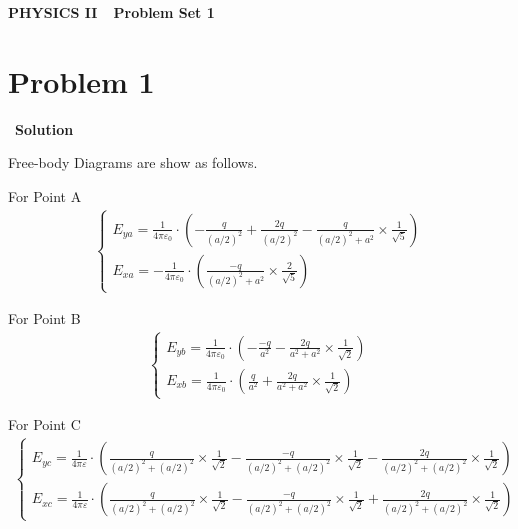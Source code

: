 \documentclass[12pt,a4paper]{article}
\begin{document}
\centerline{\Huge{{\textbf{PHYSICS II\ \ Problem Set 1}}}}
\vspace{0.5cm}
\section*{\large \textbf{Problem 1}}~{\textbf{Solution}}

Free-body Diagrams are show as follows.


For Point A
\begin{align}
    \left\{
    \begin{array}{l}
        E_{ya} = \frac{1}{4\pi\varepsilon_0} \cdot \left( -\frac{q}{(a/2)^2} + \frac{2q}{(a/2)^2} - \frac{q}{(a/2)^2+a^2} \times \frac{1}{\sqrt{5}} \right) \\
        E_{xa} = -\frac{1}{4\pi\varepsilon_0} \cdot \left( \frac{-q}{(a/2)^2+a^2} \times \frac{2}{\sqrt{5}} \right)
    \end{array}
    \right. 
    \label{1-A}
\end{align}

For Point B
\begin{align}
    \left\{
    \begin{array}{l}
        E_{yb} = \frac{1}{4\pi\varepsilon_0} \cdot \left( -\frac{-q}{a^2} - \frac{2q}{a^2+a^2} \times \frac{1}{\sqrt{2}}\right) \\
        E_{xb} = \frac{1}{4\pi\varepsilon_0} \cdot \left( \frac{q}{a^2} + \frac{2q}{a^2+a^2} \times \frac{1}{\sqrt{2}} \right)
    \end{array}
    \right. 
    \label{1-B}
\end{align}

For Point C
\begin{align}
    \left\{
    \begin{array}{l}
        E_{yc} = \frac{1}{4\pi\varepsilon} \cdot \left( \frac{q}{(a/2)^2+(a/2)^2} \times \frac{1}{\sqrt{2}} - \frac{-q}{(a/2)^2+(a/2)^2} \times 
        \frac{1}{\sqrt{2}} - \frac{2q}{(a/2)^2+(a/2)^2} \times \frac{1}{\sqrt{2}} \right) \\
        E_{xc} = \frac{1}{4\pi\varepsilon} \cdot \left( \frac{q}{(a/2)^2+(a/2)^2} \times \frac{1}{\sqrt{2}} - \frac{-q}{(a/2)^2+(a/2)^2} \times 
        \frac{1}{\sqrt{2}} + \frac{2q}{(a/2)^2+(a/2)^2} \times \frac{1}{\sqrt{2}} \right)
    \end{array}
    \right. 
    \label{1-C}
\end{align}
\end{document}
